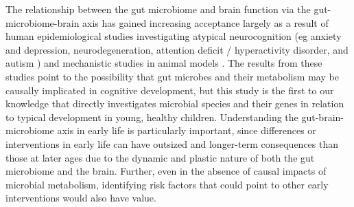 \documentclass{article}
\begin{document}
The relationship between the gut microbiome and brain function via the
gut-microbiome-brain axis has gained increasing acceptance largely as a
result of human epidemiological studies investigating atypical
neurocognition (eg anxiety and depression, neurodegeneration, attention
deficit / hyperactivity disorder, and autism \cite{romanGutBrainAxis2018,fosterGutBrainAxis2013})
and mechanistic studies in animal models
\cite{hsiaoMicrobiotaModulateBehavioral2013,needhamGutderivedMetaboliteAlters2022}.
The results from these studies point to the possibility
that gut microbes and their metabolism may be causally implicated in
cognitive development, but this study is the first to our knowledge that
directly investigates microbial species and their genes in relation to
typical development in young, healthy children. Understanding the gut-brain-microbiome axis
in early life is particularly important, since differences or
interventions in early life can have outsized and longer-term
consequences than those at later ages
due to the dynamic and plastic nature of both the gut microbiome and the brain.
Further, even in the absence of
causal impacts of microbial metabolism, identifying risk factors that
could point to other early interventions would also have value.
\end{document}
